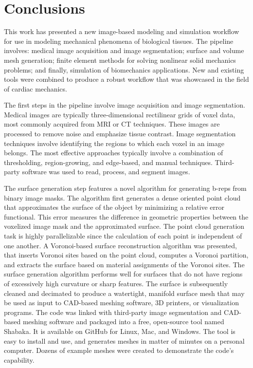 \chapter{Conclusions}
\label{chap:7}
%

This work has presented a new image-based modeling and simulation workflow for use in modeling mechanical phenomena of biological tissues. The pipeline involves: medical image acquisition and image segmentation; surface and volume mesh generation; finite element methods for solving nonlinear solid mechanics problems; and finally, simulation of biomechanics applications. New and existing tools were combined to produce a robust workflow that was showcased in the field of cardiac mechanics.

The first steps in the pipeline involve image acquisition and image segmentation. Medical images are typically three-dimensional rectilinear grids of voxel data, most commonly acquired from MRI or CT techniques. These images are processed to remove noise and emphasize tissue contrast. Image segmentation techniques involve identifying the regions to which each voxel in an image belongs. The most effective approaches typically involve a combination of thresholding, region-growing, and edge-based, and manual techniques. Third-party software was used to read, process, and segment images.

The surface generation step features a novel algorithm for generating b-reps from binary image masks. The algorithm first generates a dense oriented point cloud that approximates the surface of the object by minimizing a relative error functional. This error measures the difference in geometric properties between the voxelized image mask and the approximated surface. The point cloud generation task is highly parallelizable since the calculation of each point is independent of one another. A Voronoi-based surface reconstruction algorithm was presented, that inserts Voronoi sites based on the point cloud, computes a Voronoi partition, and extracts the surface based on material assignments of the Voronoi sites. The surface generation algorithm performs well for surfaces that do not have regions of excessively high curvature or sharp features. The surface is subsequently cleaned and decimated to produce a watertight, manifold surface mesh that may be used as input to CAD-based meshing software, 3D printers, or visualization programs. The code was linked with third-party image segmentation and CAD-based meshing software and packaged into a free, open-source tool named Shabaka. It is available on GitHub for Linux, Mac, and Windows. The tool is easy to install and use, and generates meshes in matter of minutes on a personal computer. Dozens of example meshes were created to demonstrate the code's capability.

